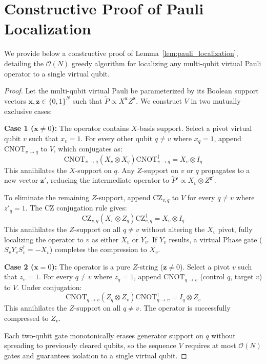 \documentclass[a4paper, onecolumn, unpublished]{quantumarticle}
\begin{document}
    \section{Constructive Proof of Pauli Localization}
    \label{app:pauli_localization}
    We provide below a constructive proof of Lemma~\ref{lem:pauli_localization}, detailing the $\mathcal{O}(N)$ greedy algorithm for localizing any multi-qubit virtual Pauli operator to a single virtual qubit.
    \begin{proof}
        Let the multi-qubit virtual Pauli be parameterized by its Boolean support vectors $\mathbf{x}, \mathbf{z} \in \{0,1\}^N$ such that $\tilde{P} \propto X^{\mathbf{x}} Z^{\mathbf{z}}$. We construct $V$ in two mutually exclusive cases:

        \textbf{Case 1 ($\mathbf{x} \neq 0$):} The operator contains $X$-basis support. Select a pivot virtual qubit $v$ such that $x_v = 1$. For every other qubit $q \neq v$ where $x_q = 1$, append $\text{CNOT}_{v \to q}$ to $V$, which conjugates as:
        \begin{equation}
            \text{CNOT}_{v \to q} (X_v \otimes X_q) \text{CNOT}_{v \to q}^\dagger = X_v \otimes I_q
        \end{equation}
        This annihilates the $X$-support on $q$. Any $Z$-support on $v$ or $q$ propagates to a new vector $\mathbf{z}'$, reducing the intermediate operator to $\tilde{P}' \propto X_v \otimes Z^{\mathbf{z}'}$.

        To eliminate the remaining $Z$-support, append $\text{CZ}_{v, q}$ to $V$ for every $q \neq v$ where $z'_q = 1$. The CZ conjugation rule gives:
        \begin{equation}
            \text{CZ}_{v, q} (X_v \otimes Z_q) \text{CZ}_{v, q}^\dagger = X_v \otimes I_q
        \end{equation}
        This annihilates the $Z$-support on all $q \neq v$ without altering the $X_v$ pivot, fully localizing the operator to $v$ as either $X_v$ or $Y_v$. If $Y_v$ results, a virtual Phase gate ($S_v Y_v S_v^\dagger = -X_v$) completes the compression to $X_v$.

        \textbf{Case 2 ($\mathbf{x} = 0$):} The operator is a pure $Z$-string ($\mathbf{z} \neq 0$). Select a pivot $v$ such that $z_v = 1$. For every $q \neq v$ where $z_q = 1$, append $\text{CNOT}_{q \to v}$ (control $q$, target $v$) to $V$. Under conjugation:
        \begin{equation}
            \text{CNOT}_{q \to v} (Z_q \otimes Z_v) \text{CNOT}_{q \to v}^\dagger  = I_q \otimes Z_v
        \end{equation}
        This annihilates the $Z$-support on all $q \neq v$. The operator is successfully compressed to $Z_v$.

        Each two-qubit gate monotonically erases generator support on $q$ without spreading to previously cleared qubits, so the sequence $V$ requires at most $\mathcal{O}(N)$ gates and guarantees isolation to a single virtual qubit.
    \end{proof}
\end{document}
